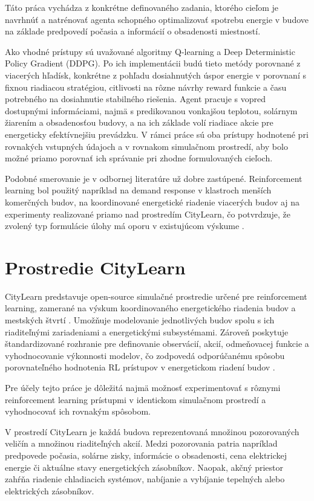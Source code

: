 \documentclass[conference]{IEEEtran}
\begin{document}
Táto práca vychádza z konkrétne definovaného zadania, ktorého cieľom je navrhnúť a natrénovať agenta schopného optimalizovať spotrebu energie v budove na základe predpovedí počasia a informácií o obsadenosti miestností.

Ako vhodné prístupy sú uvažované algoritmy Q-learning a Deep Deterministic Policy Gradient (DDPG). Po ich implementácii budú tieto metódy porovnané z viacerých hľadísk, konkrétne z pohľadu dosiahnutých úspor energie v porovnaní s fixnou riadiacou stratégiou, citlivosti na rôzne návrhy reward funkcie a času potrebného na dosiahnutie stabilného riešenia.
Agent pracuje s vopred dostupnými informáciami, najmä s predikovanou vonkajšou teplotou, solárnym žiarením a obsadenosťou budovy, a na ich základe volí riadiace akcie pre energeticky efektívnejšiu prevádzku. V rámci práce sú oba prístupy hodnotené pri rovnakých vstupných údajoch a v rovnakom simulačnom prostredí, aby bolo možné priamo porovnať ich správanie pri zhodne formulovaných cieľoch.

Podobné smerovanie je v odbornej literatúre už dobre zastúpené. Reinforcement learning bol použitý napríklad na demand response v klastroch menších komerčných budov, na koordinované energetické riadenie viacerých budov aj na experimenty realizované priamo nad prostredím CityLearn, čo potvrdzuje, že zvolený typ formulácie úlohy má oporu v existujúcom výskume \cite{b17,b18,b19,b20}.


\section{Prostredie CityLearn}

CityLearn predstavuje open-source simulačné prostredie určené pre reinforcement learning, zamerané na výskum koordinovaného energetického riadenia budov a mestských štvrtí \cite{b1}. Umožňuje modelovanie jednotlivých budov spolu s ich riaditeľnými zariadeniami a energetickými subsystémami. Zároveň poskytuje štandardizované rozhranie pre definovanie observácií, akcií, odmeňovacej funkcie a vyhodnocovanie výkonnosti modelov, čo zodpovedá odporúčanému spôsobu porovnateľného hodnotenia RL prístupov v energetickom riadení budov \cite{b15}.

Pre účely tejto práce je dôležitá najmä možnosť experimentovať s rôznymi reinforcement learning prístupmi v identickom simulačnom prostredí a vyhodnocovať ich rovnakým spôsobom.

V prostredí CityLearn je každá budova reprezentovaná množinou pozorovaných veličín a množinou riaditeľných akcií. Medzi pozorovania patria napríklad predpovede počasia, solárne zisky, informácie o obsadenosti, cena elektrickej energie či aktuálne stavy energetických zásobníkov. Naopak, akčný priestor zahŕňa riadenie chladiacich systémov, nabíjanie a vybíjanie tepelných alebo elektrických zásobníkov.
\end{document}
